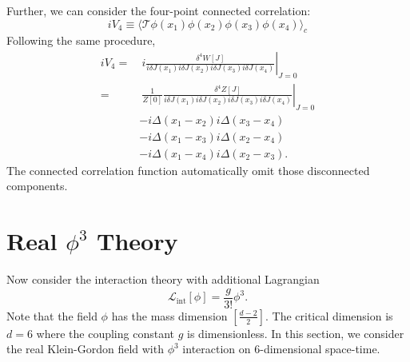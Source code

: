 Further, we can consider the four-point connected correlation:
\begin{equation}
	iV_4 \equiv \langle \mathcal{T}\phi(x_1) \phi(x_2) \phi(x_3) \phi(x_4)\rangle_c
\end{equation}
Following the same procedure,
\begin{equation}
\begin{aligned}
	iV_4 
	=&\ i\left.\frac{\delta^4 W[J]}{i\delta J(x_1)i\delta J(x_2)i\delta J(x_3)i\delta J(x_4)}\right|_{J=0} \\
	=&\ \frac{1}{Z[0]}\left.\frac{\delta^4 Z[J]}{i\delta J(x_1)i\delta J(x_2)i\delta J(x_3)i\delta J(x_4)}\right|_{J=0} \\
	& -i\Delta(x_1-x_2) i\Delta(x_3-x_4) \\
	& -i\Delta(x_1-x_3) i\Delta(x_2-x_4) \\
	& -i\Delta(x_1-x_4) i\Delta(x_2-x_3).
\end{aligned}
\end{equation}
The connected correlation function automatically omit those disconnected components.





\section{Real $\phi^3$ Theory}

Now consider the interaction theory with additional Lagrangian
\begin{equation}
	\mathcal L_{\mathrm{int}}[\phi] = \frac{g}{3!}\phi^3.
\end{equation}
Note that the field $\phi$ has the mass dimension $[\frac{d-2}{2}]$. 
The critical dimension is $d=6$ where the coupling constant $g$ is dimensionless. 
In this section, we consider the real Klein-Gordon field with $\phi^3$ interaction on 6-dimensional space-time.



